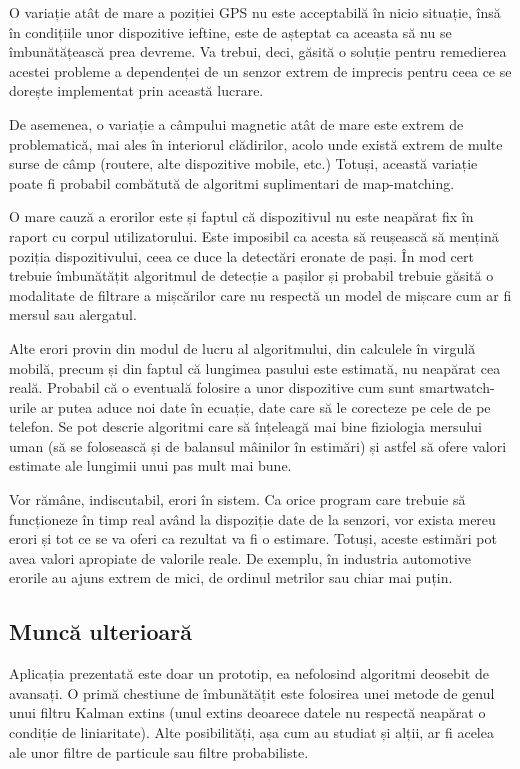 \documentclass[12pt, a4paper, oneside]{article}
\begin{document}
O variație atât de mare a poziției GPS nu este acceptabilă în nicio situație, însă în condițiile unor dispozitive ieftine, este de așteptat ca aceasta să nu se îmbunătățească prea devreme. Va trebui, deci, găsită o soluție pentru remedierea acestei probleme a dependenței de un senzor extrem de imprecis pentru ceea ce se dorește implementat prin această lucrare.

De asemenea, o variație a câmpului magnetic atât de mare este extrem de problematică, mai ales în interiorul clădirilor, acolo unde există extrem de multe surse de câmp (routere, alte dispozitive mobile, etc.) Totuși, această variație poate fi probabil combătută de algoritmi suplimentari de map-matching.

O mare cauză a erorilor este și faptul că dispozitivul nu este neapărat fix în raport cu corpul utilizatorului. Este imposibil ca acesta să reușească să mențină poziția dispozitivului, ceea ce duce la detectări eronate de pași. În mod cert trebuie îmbunătățit algoritmul de detecție a pașilor și probabil trebuie găsită o modalitate de filtrare a mișcărilor care nu respectă un model de mișcare cum ar fi mersul sau alergatul.

Alte erori provin din modul de lucru al algoritmului, din calculele în virgulă mobilă, precum și din faptul că lungimea pasului este estimată, nu neapărat cea reală. Probabil că o eventuală folosire a unor dispozitive cum sunt smartwatch-urile ar putea aduce noi date în ecuație, date care să le corecteze pe cele de pe telefon. Se pot descrie algoritmi care să înțeleagă mai bine fiziologia mersului uman (să se folosească și de balansul mâinilor în estimări) și astfel să ofere valori estimate ale lungimii unui pas mult mai bune.

Vor rămâne, indiscutabil, erori în sistem. Ca orice program care trebuie să funcționeze în timp real având la dispoziție date de la senzori, vor exista mereu erori și tot ce se va oferi ca rezultat va fi o estimare. Totuși, aceste estimări pot avea valori apropiate de valorile reale. De exemplu, în industria automotive erorile au ajuns extrem de mici, de ordinul metrilor sau chiar mai puțin.


\subsection{Muncă ulterioară} \label{MuncaUlterioara}
Aplicația prezentată este doar un prototip, ea nefolosind algoritmi deosebit de avansați. O primă chestiune de îmbunătățit este folosirea unei metode de genul unui filtru Kalman extins (unul extins deoarece datele nu respectă neapărat o condiție de liniaritate). Alte posibilități, așa cum au studiat și alții, ar fi acelea ale unor filtre de particule sau filtre probabiliste.
\end{document}

